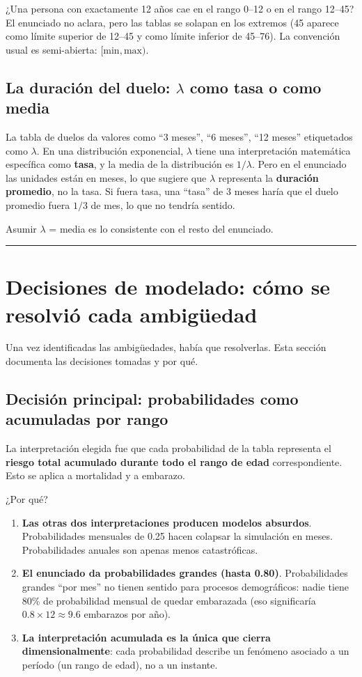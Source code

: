 \documentclass[12pt,a4paper]{article}
\begin{document}
¿Una persona con exactamente 12 años cae en el rango 0--12 o en el rango 12--45? El enunciado no aclara, pero las tablas se solapan en los extremos (45 aparece como límite superior de 12--45 y como límite inferior de 45--76). La convención usual es semi-abierta: $[\mathrm{min}, \mathrm{max})$.

\subsection{La duración del duelo: $\lambda$ como tasa o como media}

La tabla de duelos da valores como ``3 meses'', ``6 meses'', ``12 meses'' etiquetados como $\lambda$. En una distribución exponencial, $\lambda$ tiene una interpretación matemática específica como \textbf{tasa}, y la media de la distribución es $1/\lambda$. Pero en el enunciado las unidades están en meses, lo que sugiere que $\lambda$ representa la \textbf{duración promedio}, no la tasa. Si fuera tasa, una ``tasa'' de 3 meses haría que el duelo promedio fuera $1/3$ de mes, lo que no tendría sentido.

Asumir $\lambda$ = media es lo consistente con el resto del enunciado.

\begin{center}\rule{0.7\linewidth}{0.4pt}\end{center}

\section{Decisiones de modelado: cómo se resolvió cada ambigüedad}

Una vez identificadas las ambigüedades, había que resolverlas. Esta sección documenta las decisiones tomadas y por qué.

\subsection{Decisión principal: probabilidades como acumuladas por rango}

La interpretación elegida fue que cada probabilidad de la tabla representa el \textbf{riesgo total acumulado durante todo el rango de edad} correspondiente. Esto se aplica a mortalidad y a embarazo.

¿Por qué?

\begin{enumerate}
    \item \textbf{Las otras dos interpretaciones producen modelos absurdos}. Probabilidades mensuales de 0.25 hacen colapsar la simulación en meses. Probabilidades anuales son apenas menos catastróficas.
    \item \textbf{El enunciado da probabilidades grandes (hasta 0.80)}. Probabilidades grandes ``por mes'' no tienen sentido para procesos demográficos: nadie tiene 80\% de probabilidad mensual de quedar embarazada (eso significaría $0.8 \times 12 \approx 9.6$ embarazos por año).
    \item \textbf{La interpretación acumulada es la única que cierra dimensionalmente}: cada probabilidad describe un fenómeno asociado a un período (un rango de edad), no a un instante.
\end{enumerate}
\end{document}
